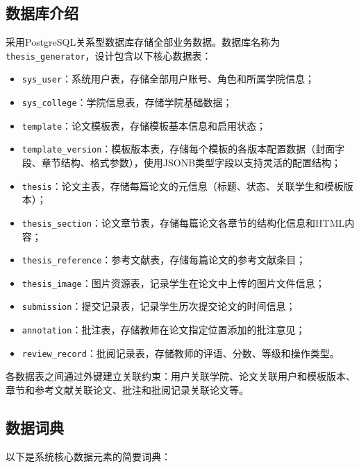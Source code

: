 \subsection{数据库介绍}

采用PostgreSQL关系型数据库存储全部业务数据。数据库名称为\verb|thesis_generator|，设计包含以下核心数据表：

\begin{itemize}
    \item \verb|sys_user|：系统用户表，存储全部用户账号、角色和所属学院信息；
    \item \verb|sys_college|：学院信息表，存储学院基础数据；
    \item \verb|template|：论文模板表，存储模板基本信息和启用状态；
    \item \verb|template_version|：模板版本表，存储每个模板的各版本配置数据（封面字段、章节结构、格式参数），使用JSONB类型字段以支持灵活的配置结构；
    \item \verb|thesis|：论文主表，存储每篇论文的元信息（标题、状态、关联学生和模板版本）；
    \item \verb|thesis_section|：论文章节表，存储每篇论文各章节的结构化信息和HTML内容；
    \item \verb|thesis_reference|：参考文献表，存储每篇论文的参考文献条目；
    \item \verb|thesis_image|：图片资源表，记录学生在论文中上传的图片文件信息；
    \item \verb|submission|：提交记录表，记录学生历次提交论文的时间信息；
    \item \verb|annotation|：批注表，存储教师在论文指定位置添加的批注意见；
    \item \verb|review_record|：批阅记录表，存储教师的评语、分数、等级和操作类型。
\end{itemize}

各数据表之间通过外键建立关联约束：用户关联学院、论文关联用户和模板版本、章节和参考文献关联论文、批注和批阅记录关联论文等。

\subsection{数据词典}

以下是系统核心数据元素的简要词典：

